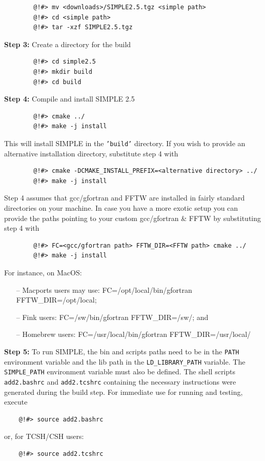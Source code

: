 \documentclass[a4paper,11pt]{article}
\begin{document}
\begin{verbatim}
        @!#> mv <downloads>/SIMPLE2.5.tgz <simple path>
        @!#> cd <simple path>
        @!#> tar -xzf SIMPLE2.5.tgz
\end{verbatim}

\noindent{}\textbf{Step 3:} Create a directory for the build

\begin{verbatim}
        @!#> cd simple2.5
        @!#> mkdir build
        @!#> cd build
\end{verbatim}

\noindent{}\textbf{Step 4:} Compile and install SIMPLE 2.5

\begin{verbatim}
        @!#> cmake ../
        @!#> make -j install
\end{verbatim}

\noindent{}This will install SIMPLE in the \texttt{'build'} directory. If you wish to provide an alternative installation directory, substitute step 4 with

\begin{verbatim}
        @!#> cmake -DCMAKE_INSTALL_PREFIX=<alternative directory> ../
        @!#> make -j install
\end{verbatim}

\noindent{}Step 4 assumes that gcc/gfortran and FFTW are installed in fairly standard directories on your machine. In case you have a 
more exotic setup you can provide the paths pointing to your custom gcc/gfortran \& FFTW by substituting step 4 with

\begin{verbatim}
        @!#> FC=<gcc/gfortran path> FFTW_DIR=<FFTW path> cmake ../
        @!#> make -j install
\end{verbatim}

\noindent{}For instance, on MacOS:
\begin{itemize}
	\item[--] Macports users may use: FC=/opt/local/bin/gfortran FFTW\_DIR=/opt/local;
	\item[--] Fink users: FC=/sw/bin/gfortran FFTW\_DIR=/sw/; and
	\item[--] Homebrew users: FC=/usr/local/bin/gfortran FFTW\_DIR=/usr/local/
\end{itemize}

\noindent{}\textbf{Step 5:} To run SIMPLE, the bin and scripts paths need to be in the \texttt{PATH} environment
variable and the lib path in the \texttt{LD\_LIBRARY\_PATH} variable. The \texttt{SIMPLE\_PATH} environment
 variable must also be defined. The shell scripts \texttt{add2.bashrc} and \texttt{add2.tcshrc} containing the necessary 
 instructions were generated during the build step. For immediate use for running and testing, execute
\begin{verbatim}
    @!#> source add2.bashrc
\end{verbatim}
\noindent{}or, for TCSH/CSH users:
\begin{verbatim}
    @!#> source add2.tcshrc
\end{verbatim}
\end{document}
